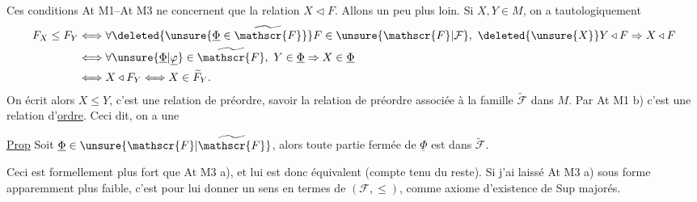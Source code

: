 Ces conditions At M1--At M3  ne concernent que \deleted{$\unsure{\Leftarrow|\leftarrow|\triangleleft}$} la relation $X\triangleleft F$. Allons un peu plus loin. Si $X,Y\in M$, on a tautologiquement
\[
\begin{aligned}
F_X\leq F_Y&\Longleftrightarrow\forall\deleted{\unsure{\underline{\Phi}\in\widetilde{\mathscr{F}}}}F\in\unsure{\mathscr{F}|\mathcal{F}},\ \deleted{\unsure{X}}Y\triangleleft F\Rightarrow X\triangleleft F\\
&\Longleftrightarrow\forall\unsure{\underline{\Phi}|\underline{\varphi}}\in\widetilde{\mathscr{F}},\ Y\in\underline{\Phi}\Rightarrow X\in\underline{\Phi}\\
&\Longleftrightarrow X\triangleleft F_Y\Longleftrightarrow X\in\widetilde{F}_Y.
\end{aligned}
\]
On écrit alors $X\leq Y$, c'est une relation de préordre, savoir la relation de préordre associée à la famille  $\widetilde{\mathscr{F}}$ dans $M$. Par At M1 b) c'est une relation d'\uline{ordre}. Ceci dit, on a une


\uline{Prop} Soit $\underline{\Phi}\in\unsure{\mathscr{F}|\widetilde{\mathscr{F}}}$, alors toute partie fermée \inserted{$\Psi$} de $\underline{\Phi}$ est dans $\widetilde{\mathscr{F}}$.

Ceci  est formellement plus fort que At M3 a), et lui est donc équivalent (compte tenu du reste). Si j'ai laissé At M3 a) sous forme apparemment plus faible, c'est pour lui donner un sens en termes de $(\mathscr{F},\leq)$, comme axiome d'existence de Sup majorés.


